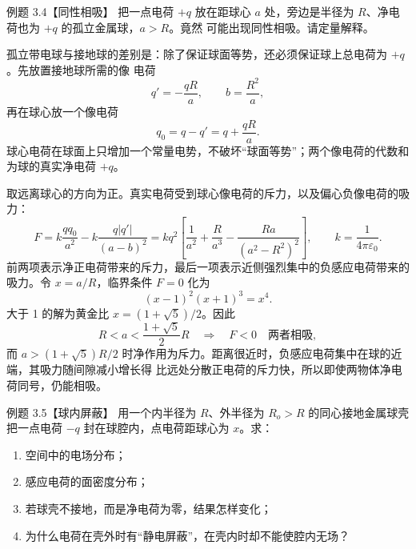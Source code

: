 \begin{origexamplebox}{例题 3.4【同性相吸】}
把一点电荷 $+q$ 放在距球心 $a$ 处，旁边是半径为 $R$、净电荷也为 $+q$ 的孤立金属球，$a>R$。竟然
可能出现同性相吸。请定量解释。
\end{origexamplebox}

\begin{xesolution}
孤立带电球与接地球的差别是：除了保证球面等势，还必须保证球上总电荷为 $+q$。先放置接地球所需的像
电荷
\[
  q'=-\frac{qR}{a},\qquad b=\frac{R^2}{a},
\]
再在球心放一个像电荷
\[
  q_0=q-q'=q+\frac{qR}{a}.
\]
球心电荷在球面上只增加一个常量电势，不破坏“球面等势”；两个像电荷的代数和为球的真实净电荷 $+q$。

\chargedIsolatedSphereImageFigure

取远离球心的方向为正。真实电荷受到球心像电荷的斥力，以及偏心负像电荷的吸力：
\[
  F=k\frac{qq_0}{a^2}-k\frac{q|q'|}{(a-b)^2}
  =kq^2\left[\frac1{a^2}+\frac{R}{a^3}
  -\frac{Ra}{(a^2-R^2)^2}\right],
  \qquad k=\frac1{4\pi\varepsilon_0}.
\]
前两项表示净正电荷带来的斥力，最后一项表示近侧强烈集中的负感应电荷带来的吸力。令 $x=a/R$，临界条件
$F=0$ 化为
\[
  (x-1)^2(x+1)^3=x^4.
\]
大于 1 的解为黄金比 $x=(1+\sqrt5)/2$。因此
\[
  \boxed{R<a<\frac{1+\sqrt5}{2}R\quad\Longrightarrow\quad F<0\quad\text{两者相吸}},
\]
而 $a>(1+\sqrt5)R/2$ 时净作用为斥力。距离很近时，负感应电荷集中在球的近端，其吸力随间隙减小增长得
比远处分散正电荷的斥力快，所以即使两物体净电荷同号，仍能相吸。
\end{xesolution}

\begin{origexamplebox}{例题 3.5【球内屏蔽】}
用一个内半径为 $R$、外半径为 $R_o>R$ 的同心接地金属球壳把一点电荷 $-q$ 封在球腔内，点电荷距球心为 $x$。求：
\begin{enumerate}[label=(\arabic*)]
  \item 空间中的电场分布；
  \item 感应电荷的面密度分布；
  \item 若球壳不接地，而是净电荷为零，结果怎样变化；
  \item 为什么电荷在壳外时有“静电屏蔽”，在壳内时却不能使腔内无场？
\end{enumerate}
\begin{center}\end{center}
\label{fig:em-source-thirty-fourth-section-5}
\end{origexamplebox}

